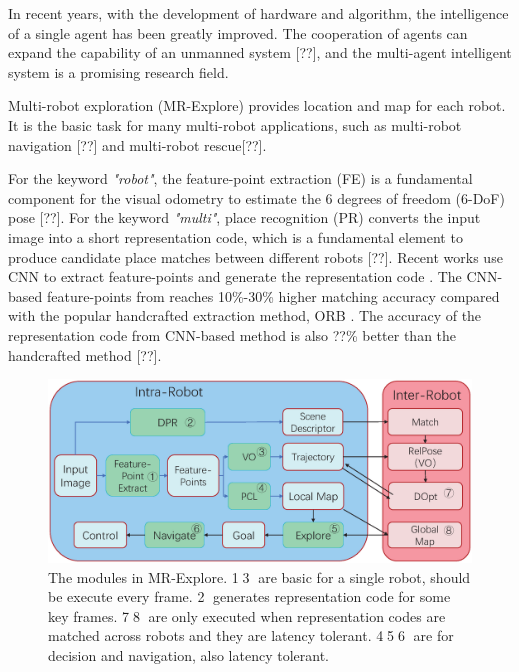 \label{sec:intro}

In recent years, with the development of hardware and algorithm, the intelligence of a single agent has been greatly improved.
The cooperation of agents can expand the capability of an unmanned system [??], and the multi-agent intelligent system is a promising research field.

Multi-robot exploration (MR-Explore) provides location and map for each robot. It is the basic task for many multi-robot applications, such as multi-robot navigation [??] and multi-robot rescue[??].

For the keyword \textit{"robot"}, the feature-point extraction (FE) is a fundamental component for the visual odometry to estimate the 6 degrees of freedom (6-DoF) pose [??].
For the keyword \textit{"multi"}, place recognition (PR) converts the input image into a short representation code, which is a fundamental element to produce candidate place matches between different robots [??].
Recent works use CNN to extract feature-points \cite{detone2018superpoint, simo2015discriminative, yi2016lift} and generate the representation code \cite{arandjelovic2016netvlad, radenovic2018fine}. 
The CNN-based feature-points from \cite{detone2018superpoint} reaches 10\%-30\% higher matching accuracy compared with the popular handcrafted extraction method, ORB \cite{Mur-Artal:2017281}.
The accuracy of the representation code from CNN-based method \cite{radenovic2018fine} is also ??\% better than the handcrafted method [??].

\begin{figure}[t]
	\centering
	\includegraphics[width=0.99\linewidth]{fig/maexp.eps}
    \caption{
        The modules in MR-Explore. \textcircled{1}\textcircled{3} are basic for a single robot, should be execute every frame. \textcircled{2} generates representation code for some key frames. \textcircled{7}\textcircled{8} are only executed when representation codes are matched across robots and they are latency tolerant.  \textcircled{4}\textcircled{5}\textcircled{6} are for decision and navigation, also latency tolerant.
    }
	\label{fig:maexp}
\end{figure}


